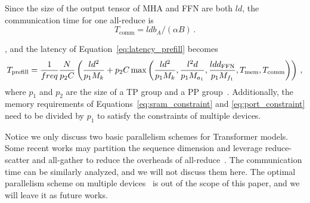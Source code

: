 Since the size of the output tensor of MHA and FFN are both $ld$, the communication time for one all-reduce is
\begin{equation}
    T_{\text{comm}}=ldb_A/(\alpha B)\,.
\end{equation}

, and the latency of Equation~\eqref{eq:latency_prefill} becomes
\begin{equation}
    \label{eq:multilatency}
    \small
    T_{\text{prefill}} = \frac{1}{freq}\frac{N}{p_2C}\left(\frac{ld^2}{p_1M_k}+p_2C\max\left(\frac{ld^2}{p_1M_k},\frac{l^2d}{p_1M_{a_1}},\frac{ldd_{\text{FFN}}}{p_1M_{f_1}}, T_{\text{mem}},T_{\text{comm}}\right)\right)\,,
\end{equation}
where $p_1$ and $p_2$ are the size of a TP group and a PP group~\cite{shoeybi2019megatron}.
Additionally, the memory requirements of Equations~\eqref{eq:sram_constraint} and \eqref{eq:port_constraint} need to be divided by $p_1$ to satisfy the constraints of multiple devices.

Notice we only discuss two basic parallelism schemes for Transformer models.
Some recent works may partition the sequence dimension and leverage reduce-scatter and all-gather to reduce the overheads of all-reduce~\cite{narayanan2021megatronv2,korthikanti2022reducing}.
The communication time can be similarly analyzed, and we will not discuss them here.
The optimal parallelism scheme on multiple devices~\cite{pope2022googleinf,colin2022unity,zheng2022alpa,miao2022galvatron,xie2022optimalplacement} is out of the scope of this paper, and we will leave it as future works.
